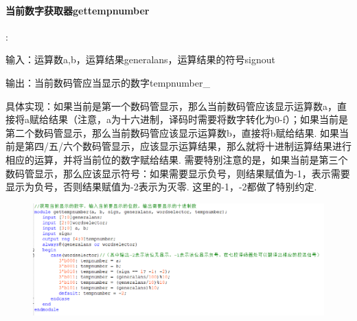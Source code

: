 \documentclass[UTF8]{ctexart}
\begin{document}
\paragraph{当前数字获取器gettempnumber}:\par
输入：运算数a,b，运算结果generalans，运算结果的符号signout\par
输出：当前数码管应当显示的数字tempnumber\_\par
具体实现：如果当前是第一个数码管显示，那么当前数码管应该显示运算数a，直接将a赋给结果（注意，a为十六进制，译码时需要将数字转化为0-f）；如果当前是第二个数码管显示，那么当前数码管应该显示运算数b，直接将b赋给结果. 如果当前是第四/五/六个数码管显示，应该显示运算结果，那么就将十进制运算结果进行相应的运算，并将当前位的数字赋给结果. 需要特别注意的是，如果当前是第三个数码管显示，那么应该显示符号：如果需要显示负号，则结果赋值为-1，表示需要显示为负号，否则结果赋值为-2表示为灭零. 这里的-1，-2都做了特别约定.
\begin{figure}[H]\begin{center}
    \includegraphics[scale=1]{gettempnumber.PNG}
\end{center}\end{figure}
\end{document}
